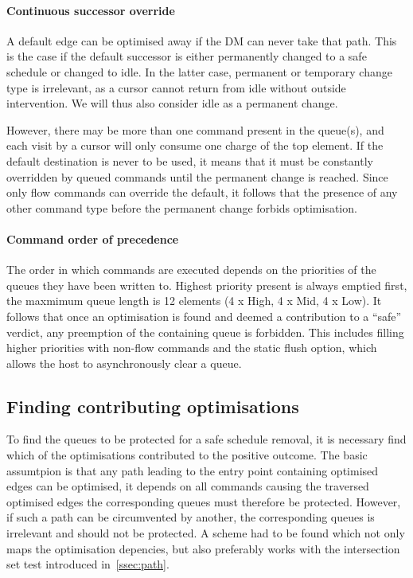 \paragraph{Continuous successor override}
A default edge can be optimised away if the DM can never take that path. This is the case if the default successor is either permanently changed to a safe schedule or changed to idle. In the latter case, permanent or temporary change type is irrelevant, as a cursor cannot return from idle without outside intervention. We will thus also consider idle as a permanent change.
\par
However, there may be more than one command present in the queue(s), and each visit by a cursor will only consume one charge of the top element. If the default destination is never to be used, it means that it must be constantly overridden by queued commands until the permanent change is reached. Since only flow commands can override the default, it follows that the presence of any other command type before the permanent change forbids optimisation.

\paragraph{Command order of precedence}
The order in which commands are executed depends on the priorities of the queues they have been written to. Highest priority present is always emptied first, the maxmimum queue length is 12 elements (4 x High, 4 x Mid, 4 x Low). It follows that once an optimisation is found and deemed a contribution to a \enquote{safe} verdict, any preemption of the containing queue is forbidden. This includes filling higher priorities with non-flow commands
and the static flush option, which allows the host to asynchronously clear a queue.


\subsection{Finding contributing optimisations}
To find the queues to be protected for a safe schedule removal, it is necessary find which of the optimisations contributed to the positive outcome.
The basic assumtpion is that any path leading to the entry point containing optimised edges can be optimised, it depends on all commands causing the traversed optimised edges the corresponding queues must therefore be protected. However, if such a path can be circumvented by another, the corresponding queues is irrelevant and should not be protected. A scheme had to be found which not only maps the optimisation depencies,
but also preferably works with the intersection set test introduced in~\ref{ssec:path}.

